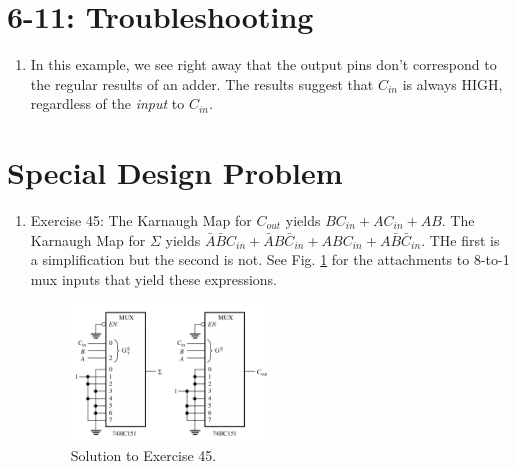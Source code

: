\documentclass[10pt]{article}
\begin{document}
\section{6-11: Troubleshooting}

\begin{enumerate}
\item In this example, we see right away that the output pins don't correspond to the regular results of an adder.  The results suggest that $C_{in}$ is always HIGH, regardless of the \textit{input} to $C_{in}$.
\end{enumerate}

\section{Special Design Problem}

\begin{enumerate}
\item Exercise 45: The Karnaugh Map for $C_{out}$ yields $BC_{in} + AC_{in} + AB$.  The Karnaugh Map for $\Sigma$ yields $\bar{A}\bar{B}C_{in} + \bar{A}B\bar{C}_{in} + ABC_{in} + A\bar{B}\bar{C}_{in}$.  THe first is a simplification but the second is not.  See Fig. \ref{fig:exer45} for the attachments to 8-to-1 mux inputs that yield these expressions.
\begin{figure}[hb]
\centering
\includegraphics[width=0.5\textwidth]{exercise45.png}
\caption{\label{fig:exer45} Solution to Exercise 45.}
\end{figure}
\end{enumerate}
\end{document}
